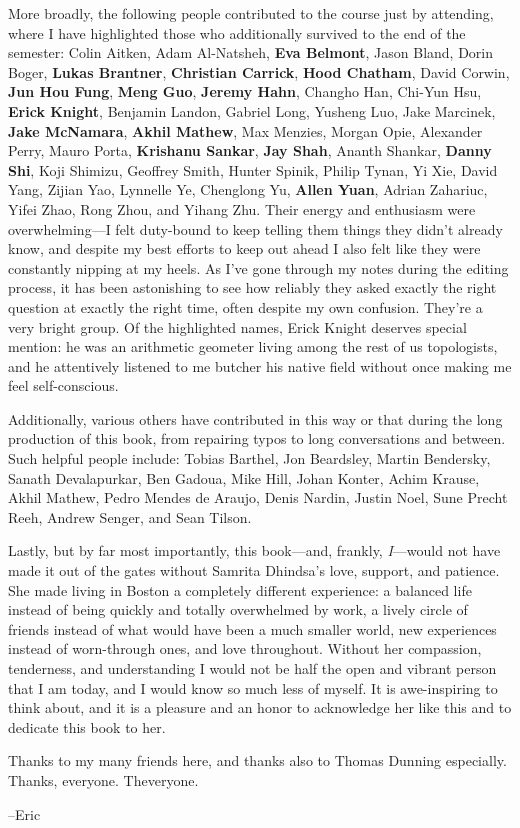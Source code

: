 More broadly, the following people contributed to the course just by attending, where I have highlighted those who additionally survived to the end of the semester: Colin Aitken, Adam Al-Natsheh, \textbf{Eva Belmont}, Jason Bland, Dorin Boger, \textbf{Lukas Brantner}, \textbf{Christian Carrick}, \textbf{Hood Chatham}, David Corwin, \textbf{Jun Hou Fung}, \textbf{Meng Guo}, \textbf{Jeremy Hahn}, Changho Han, Chi-Yun Hsu, \textbf{Erick Knight}, Benjamin Landon, Gabriel Long, Yusheng Luo, Jake Marcinek, \textbf{Jake McNamara}, \textbf{Akhil Mathew}, Max Menzies, Morgan Opie, Alexander Perry, Mauro Porta, \textbf{Krishanu Sankar}, \textbf{Jay Shah}, Ananth Shankar, \textbf{Danny Shi}, Koji Shimizu, Geoffrey Smith, Hunter Spinik, Philip Tynan, Yi Xie, David Yang, Zijian Yao, Lynnelle Ye, Chenglong Yu, \textbf{Allen Yuan}, Adrian Zahariuc, Yifei Zhao, Rong Zhou, and Yihang Zhu.  Their energy and enthusiasm were overwhelming---I felt duty-bound to keep telling them things they didn't already know, and despite my best efforts to keep out ahead I also felt like they were constantly nipping at my heels.  As I've gone through my notes during the editing process, it has been astonishing to see how reliably they asked exactly the right question at exactly the right time, often despite my own confusion.  They're a very bright group.  Of the highlighted names, Erick Knight deserves special mention: he was an arithmetic geometer living among the rest of us topologists, and he attentively listened to me butcher his native field without once making me feel self-conscious.

Additionally, various others have contributed in this way or that during the long production of this book, from repairing typos to long conversations and between.  Such helpful people include: Tobias Barthel, Jon Beardsley, Martin Bendersky, Sanath Devalapurkar, Ben Gadoua, Mike Hill, Johan Konter, Achim Krause, Akhil Mathew, Pedro Mendes de Araujo, Denis Nardin, Justin Noel, Sune Precht Reeh, Andrew Senger, and Sean Tilson.

Lastly, but by far most importantly, this book---and, frankly, \emph{I}---would not have made it out of the gates without Samrita Dhindsa's love, support, and patience.  She made living in Boston a completely different experience: a balanced life instead of being quickly and totally overwhelmed by work, a lively circle of friends instead of what would have been a much smaller world, new experiences instead of worn-through ones, and love throughout.  Without her compassion, tenderness, and understanding I would not be half the open and vibrant person that I am today, and I would know so much less of myself.  It is awe-inspiring to think about, and it is a pleasure and an honor to acknowledge her like this and to dedicate this book to her.

Thanks to my many friends here, and thanks also to Thomas Dunning especially.  Thanks, everyone.  Theveryone.

\vspace{2\baselineskip}
\hspace{3em} --Eric
